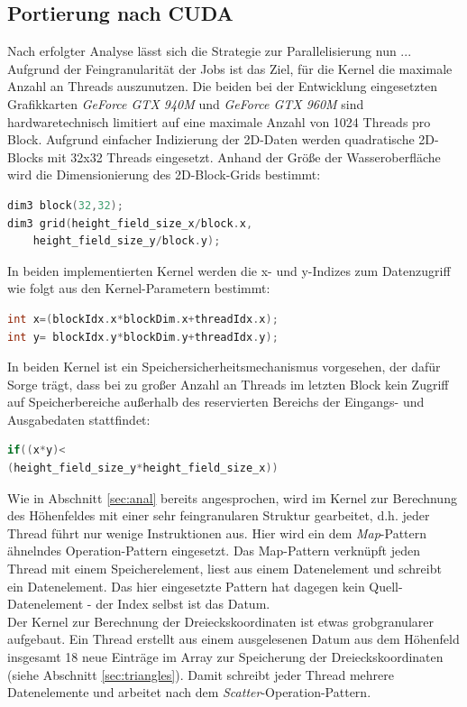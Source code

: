\documentclass[conference]{IEEEtran}
\begin{document}
\subsection{Portierung nach CUDA}\label{sec:port}
Nach erfolgter Analyse l\"asst sich die Strategie zur Parallelisierung nun ...
Aufgrund der Feingranularit\"at der Jobs ist das Ziel, f\"ur die Kernel die maximale Anzahl an Threads auszunutzen. Die beiden bei der  Entwicklung eingesetzten Grafikkarten \textit{GeForce GTX 940M} und \textit{GeForce GTX 960M} sind hardwaretechnisch limitiert auf eine maximale Anzahl von 1024 Threads pro Block. Aufgrund einfacher Indizierung der 2D-Daten werden quadratische 2D-Blocks mit 32x32 Threads eingesetzt. Anhand der Gr\"o{\ss}e der Wasseroberfl\"ache wird die Dimensionierung des 2D-Block-Grids bestimmt:

\begin{lstlisting}[language=c, caption=Bestimmung der Kernel-Parameter , captionpos=b]
dim3 block(32,32);
dim3 grid(height_field_size_x/block.x, 
	height_field_size_y/block.y);
\end{lstlisting}

In beiden implementierten Kernel werden die x- und y-Indizes zum Datenzugriff wie folgt aus den Kernel-Parametern bestimmt:

\begin{lstlisting}[language=c, caption=Bestimmung der Indizes innerhalb der Kernel, captionpos=b]
int x=(blockIdx.x*blockDim.x+threadIdx.x);
int y= blockIdx.y*blockDim.y+threadIdx.y);
\end{lstlisting}

In beiden Kernel ist ein Speichersicherheitsmechanismus vorgesehen, der daf\"ur Sorge tr\"agt, dass bei zu gro{\ss}er Anzahl an Threads im letzten Block kein Zugriff auf Speicherbereiche au{\ss}erhalb des reservierten Bereichs der Eingangs- und Ausgabedaten stattfindet:

\begin{lstlisting}[language=c, caption=Speichersicherheit im Kernel garantieren, captionpos=b]
if((x*y)<
(height_field_size_y*height_field_size_x))
\end{lstlisting}

Wie in Abschnitt \ref{sec:anal} bereits angesprochen, wird im Kernel zur Berechnung des H\"ohenfeldes mit einer sehr feingranularen Struktur gearbeitet, d.h. jeder Thread f\"uhrt nur wenige Instruktionen aus. Hier wird ein dem \textit{Map}-Pattern \"ahnelndes Operation-Pattern eingesetzt. Das Map-Pattern verkn\"upft jeden Thread mit einem Speicherelement, liest aus einem Datenelement und schreibt ein Datenelement. Das hier eingesetzte Pattern hat dagegen kein Quell-Datenelement - der Index selbst ist das Datum.
\\
Der Kernel zur Berechnung der Dreieckskoordinaten ist etwas grobgranularer aufgebaut. Ein Thread erstellt aus einem ausgelesenen Datum aus dem H\"ohenfeld insgesamt 18 neue Eintr\"age im Array zur Speicherung der Dreieckskoordinaten (siehe Abschnitt \ref{sec:triangles}). Damit schreibt jeder Thread mehrere Datenelemente und arbeitet nach dem \textit{Scatter}-Operation-Pattern.
\end{document}
